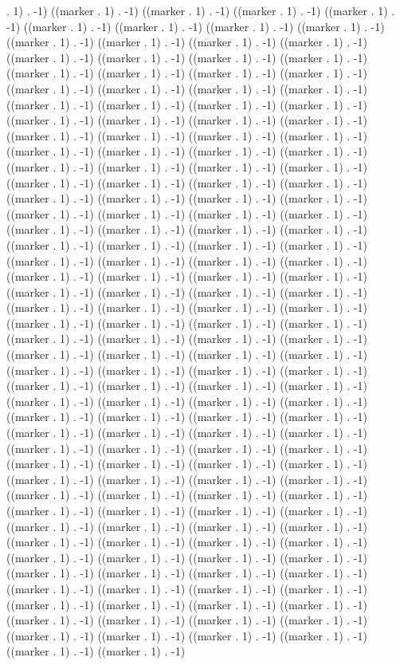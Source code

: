 . 1) . -1) ((marker . 1) . -1) ((marker . 1) . -1) ((marker . 1) . -1) ((marker . 1) . -1) ((marker . 1) . -1) ((marker . 1) . -1) ((marker . 1) . -1) ((marker . 1) . -1) ((marker . 1) . -1) ((marker . 1) . -1) ((marker . 1) . -1) ((marker . 1) . -1) ((marker . 1) . -1) ((marker . 1) . -1) ((marker . 1) . -1) ((marker . 1) . -1) ((marker . 1) . -1) ((marker . 1) . -1) ((marker . 1) . -1) ((marker . 1) . -1) ((marker . 1) . -1) ((marker . 1) . -1) ((marker . 1) . -1) ((marker . 1) . -1) ((marker . 1) . -1) ((marker . 1) . -1) ((marker . 1) . -1) ((marker . 1) . -1) ((marker . 1) . -1) ((marker . 1) . -1) ((marker . 1) . -1) ((marker . 1) . -1) ((marker . 1) . -1) ((marker . 1) . -1) ((marker . 1) . -1) ((marker . 1) . -1) ((marker . 1) . -1) ((marker . 1) . -1) ((marker . 1) . -1) ((marker . 1) . -1) ((marker . 1) . -1) ((marker . 1) . -1) ((marker . 1) . -1) ((marker . 1) . -1) ((marker . 1) . -1) ((marker . 1) . -1) ((marker . 1) . -1) ((marker . 1) . -1) ((marker . 1) . -1) ((marker . 1) . -1) ((marker . 1) . -1) ((marker . 1) . -1) ((marker . 1) . -1) ((marker . 1) . -1) ((marker . 1) . -1) ((marker . 1) . -1) ((marker . 1) . -1) ((marker . 1) . -1) ((marker . 1) . -1) ((marker . 1) . -1) ((marker . 1) . -1) ((marker . 1) . -1) ((marker . 1) . -1) ((marker . 1) . -1) ((marker . 1) . -1) ((marker . 1) . -1) ((marker . 1) . -1) ((marker . 1) . -1) ((marker . 1) . -1) ((marker . 1) . -1) ((marker . 1) . -1) ((marker . 1) . -1) ((marker . 1) . -1) ((marker . 1) . -1) ((marker . 1) . -1) ((marker . 1) . -1) ((marker . 1) . -1) ((marker . 1) . -1) ((marker . 1) . -1) ((marker . 1) . -1) ((marker . 1) . -1) ((marker . 1) . -1) ((marker . 1) . -1) ((marker . 1) . -1) ((marker . 1) . -1) ((marker . 1) . -1) ((marker . 1) . -1) ((marker . 1) . -1) ((marker . 1) . -1) ((marker . 1) . -1) ((marker . 1) . -1) ((marker . 1) . -1) ((marker . 1) . -1) ((marker . 1) . -1) ((marker . 1) . -1) ((marker . 1) . -1) ((marker . 1) . -1) ((marker . 1) . -1) ((marker . 1) . -1) ((marker . 1) . -1) ((marker . 1) . -1) ((marker . 1) . -1) ((marker . 1) . -1) ((marker . 1) . -1) ((marker . 1) . -1) ((marker . 1) . -1) ((marker . 1) . -1) ((marker . 1) . -1) ((marker . 1) . -1) ((marker . 1) . -1) ((marker . 1) . -1) ((marker . 1) . -1) ((marker . 1) . -1) ((marker . 1) . -1) ((marker . 1) . -1) ((marker . 1) . -1) ((marker . 1) . -1) ((marker . 1) . -1) ((marker . 1) . -1) ((marker . 1) . -1) ((marker . 1) . -1) ((marker . 1) . -1) ((marker . 1) . -1) ((marker . 1) . -1) ((marker . 1) . -1) ((marker . 1) . -1) ((marker . 1) . -1) ((marker . 1) . -1) ((marker . 1) . -1) ((marker . 1) . -1) ((marker . 1) . -1) ((marker . 1) . -1) ((marker . 1) . -1) ((marker . 1) . -1) ((marker . 1) . -1) ((marker . 1) . -1) ((marker . 1) . -1) ((marker . 1) . -1) ((marker . 1) . -1) ((marker . 1) . -1) ((marker . 1) . -1) ((marker . 1) . -1) ((marker . 1) . -1) ((marker . 1) . -1) ((marker . 1) . -1) ((marker . 1) . -1) ((marker . 1) . -1) ((marker . 1) . -1) ((marker . 1) . -1) ((marker . 1) . -1) ((marker . 1) . -1) ((marker . 1) . -1) ((marker . 1) . -1) ((marker . 1) . -1) ((marker . 1) . -1) ((marker . 1) . -1) ((marker . 1) . -1) ((marker . 1) . -1) ((marker . 1) . -1) ((marker . 1) . -1) ((marker . 1) . -1) ((marker . 1) . -1) ((marker . 1) . -1) ((marker . 1) . -1) ((marker . 1) . -1) ((marker . 1) . -1) 